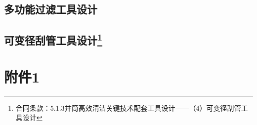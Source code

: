 \documentclass[12pt, a4paper, zihao=-4, openright]{ctexrep}
\begin{document}
\section{多功能过滤工具设计}
	
\section[可变径刮管工具设计]{可变径刮管工具设计\protect\footnote{合同条款：5.1.3井筒高效清洁关键技术配套工具设计——（4）可变径刮管工具设计}}
	
	




\newpage
\appendix
\setcounter{chapter}{1}
\renewcommand{\thesection}{\arabic{chapter}.\arabic{section}}

\chapter*{附件1}


\end{document}
